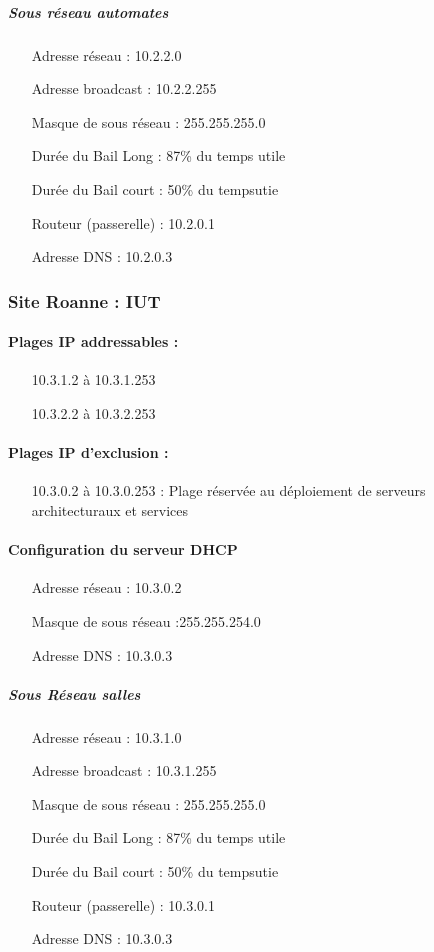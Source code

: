 \documentclass[a4paper]{article}
\begin{document}
\subparagraph{Sous réseau automates}
\begin{itemize}
\item[Adresse réseau]: 10.2.2.0
\item[Adresse broadcast]: 10.2.2.255
\item[Masque de sous réseau]: 255.255.255.0
\item[Durée du Bail Long]: 87\% du temps utile
\item[Durée du Bail court]: 50\% du tempsutie
\item[Routeur (passerelle)]: 10.2.0.1
\item[Adresse DNS]: 10.2.0.3
\end{itemize}

\subsubsection{Site Roanne : IUT}

\paragraph{Plages IP addressables :} 
\begin{itemize}
\item[10.3.1.2 à 10.3.1.253]
\item[10.3.2.2 à 10.3.2.253]
\end{itemize}

\paragraph{Plages IP d'exclusion :}
\begin{itemize}
\item[10.3.0.2 à 10.3.0.253] : Plage réservée au déploiement de serveurs architecturaux et services
\end{itemize}

\paragraph{Configuration du serveur DHCP}

\begin{itemize}
\item[Adresse réseau]: 10.3.0.2
\item[Masque de sous réseau]:255.255.254.0
\item[Adresse DNS]: 10.3.0.3
\end{itemize}

\subparagraph{Sous Réseau salles}
\begin{itemize}
\item[Adresse réseau]: 10.3.1.0
\item[Adresse broadcast]: 10.3.1.255
\item[Masque de sous réseau]: 255.255.255.0
\item[Durée du Bail Long]: 87\% du temps utile
\item[Durée du Bail court]: 50\% du tempsutie
\item[Routeur (passerelle)]: 10.3.0.1
\item[Adresse DNS]: 10.3.0.3
\end{itemize}
\end{document}
